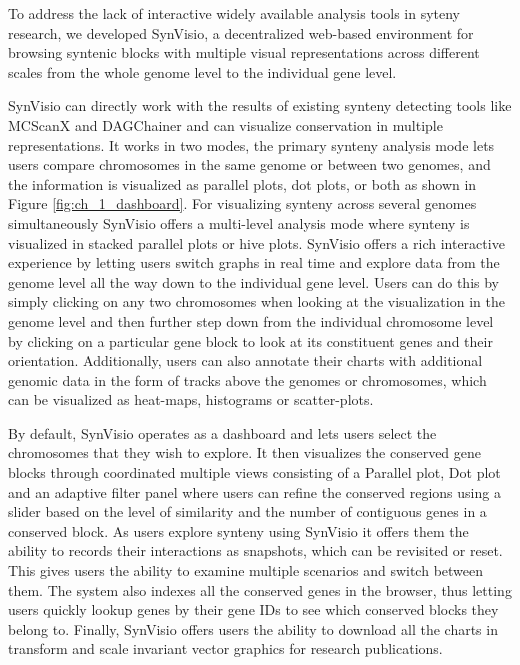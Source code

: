 To address the lack of interactive widely available analysis tools in syteny research, we developed SynVisio, a decentralized web-based environment for browsing syntenic blocks with multiple visual representations across different scales from the whole genome level to the individual gene level.

SynVisio can directly work with the results of existing synteny detecting tools like MCScanX\cite{wang2012mcscanx} and DAGChainer\cite{haas2004dagchainer} and can visualize conservation in multiple representations. It works in two modes, the primary synteny analysis mode lets users compare chromosomes in the same genome or between two genomes, and the information is visualized as parallel plots, dot plots, or both as shown in Figure \ref{fig:ch_1_dashboard}. For visualizing synteny across several genomes simultaneously SynVisio offers a multi-level analysis mode where synteny is visualized in stacked parallel plots or hive plots. SynVisio offers a rich interactive experience by letting users switch graphs in real time and explore data from the genome level all the way down to the individual gene level. Users can do this by simply clicking on any two chromosomes when looking at the visualization in the genome level and then further step down from the individual chromosome level by clicking on a particular gene block to look at its constituent genes and their orientation. Additionally, users can also annotate their charts with additional genomic data in the form of tracks above the genomes or chromosomes, which can be visualized as heat-maps, histograms or scatter-plots.

By default, SynVisio operates as a dashboard and lets users select the chromosomes that they wish to explore. It then visualizes the conserved gene blocks through coordinated multiple views consisting of a Parallel plot, Dot plot and an adaptive filter panel where users can refine the conserved regions using a slider based on the level of similarity and the number of contiguous genes in a conserved block.
As users explore synteny using SynVisio it offers them the ability to records their interactions as snapshots, which can be revisited or reset. This gives users the ability to examine multiple scenarios and switch between them. The system also indexes all the conserved genes in the browser, thus letting users quickly lookup genes by their gene IDs to see which conserved blocks they belong to. Finally, SynVisio offers users the ability to download all the charts in transform and scale invariant vector graphics for research publications.


